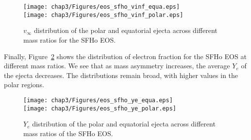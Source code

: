 \begin{figure}[!htbp]
  \centering
  \texttt{[image: chap3/Figures/eos\_sfho\_vinf\_equa.eps]}\\
  \texttt{[image: chap3/Figures/eos\_sfho\_vinf\_polar.eps]}
\caption{
   $v_\infty$ distribution of the polar and equatorial ejecta across different mass ratios for the SFHo EOS.
}
\label{fig:vinf_ejecta_tab_sfho}
\end{figure}

Finally, Figure~\ref{fig:ye_ejecta_tab_sfho} shows the distribution of electron fraction for the SFHo EOS at different mass ratios. We see that as mass asymmetry increases, 
the average $Y_e$ of the ejecta decreases.
The distributions remain broad, with higher values in the polar regions.

\begin{figure}[!htbp]
  \centering
     \texttt{[image: chap3/Figures/eos\_sfho\_ye\_equa.eps]}\\
 \texttt{[image: chap3/Figures/eos\_sfho\_ye\_polar.eps]}
\caption{
   $Y_e$ distribution of the polar and equatorial ejecta across different mass ratios of the SFHo EOS.
}
\label{fig:ye_ejecta_tab_sfho}
\end{figure}


